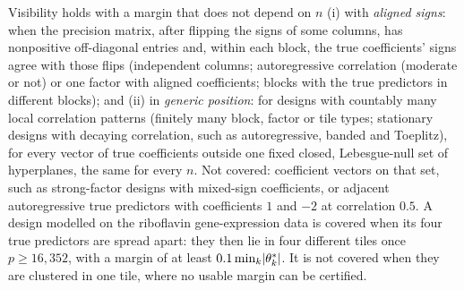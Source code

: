 \begin{remark}\label{rem:vis}
Visibility holds with a margin that does not depend on $n$ (i) with \emph{aligned signs}: when the precision matrix,
after flipping the signs of some columns, has nonpositive off-diagonal entries and, within each block, the true
coefficients' signs agree with those flips (independent columns; autoregressive correlation (moderate or not) or one factor with aligned
coefficients; blocks with the true predictors in different blocks); and (ii) in \emph{generic position}: for designs with
countably many local correlation patterns (finitely many block, factor or tile types; stationary designs with decaying
correlation, such as autoregressive, banded and Toeplitz), for every vector of true coefficients outside one fixed closed,
Lebesgue-null set of hyperplanes, the same for every $n$. Not covered: coefficient vectors on that set, such as strong-factor designs with mixed-sign coefficients, or adjacent
autoregressive true predictors with coefficients $1$ and $-2$ at correlation $0.5$. A design modelled on the riboflavin
gene-expression data is covered when its four true predictors are spread apart: they then lie in four different tiles
once $p\ge16{,}352$, with a margin of at least $0.1\min_k\lvert \theta^*_k\rvert$. It is not covered when they are clustered
in one tile, where no usable margin can be certified.
\end{remark}

